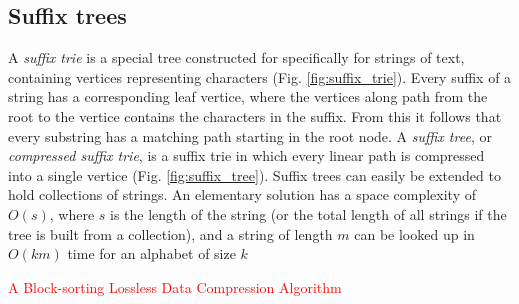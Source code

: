 \documentclass[thesis.tex]{subfiles}
\begin{document}
\subsection{Suffix trees}
A \textit{suffix trie} is a special tree constructed for specifically for strings of text, containing vertices representing characters (Fig. \ref{fig:suffix_trie}). Every suffix of a string has a corresponding leaf vertice, where the vertices along path from the root to the vertice contains the characters in the suffix. From this it follows that every substring has a matching path starting in the root node. A \textit{suffix tree}, or \textit{compressed suffix trie}, is a suffix trie in which every linear path is compressed into a single vertice (Fig. \ref{fig:suffix_tree}). Suffix trees can easily be extended to hold collections of strings\cite[Chapter 20]{algorithms_sequential_parallell_and_distributed}. An elementary solution has a space complexity of $O(s)$, where $s$ is the length of the string (or the total length of all strings if the tree is built from a collection), and a string of length $m$ can be looked up in $O(km)$ time for an alphabet of size $k$\cite[Section 20.6.1]{algorithms_sequential_parallell_and_distributed}\\
\par\noindent
\textcolor{red}{A Block-sorting Lossless Data Compression Algorithm}
\end{document}
